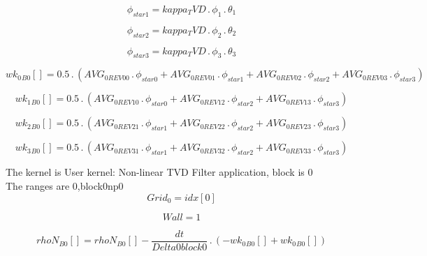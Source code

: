 \documentclass{article}
\begin{document}
\begin{dmath}\phi_{star 1} = kappa_TVD \,.\, \phi_{1} \,.\, \theta_{1}\end{dmath}

\begin{dmath}\phi_{star 2} = kappa_TVD \,.\, \phi_{2} \,.\, \theta_{2}\end{dmath}

\begin{dmath}\phi_{star 3} = kappa_TVD \,.\, \phi_{3} \,.\, \theta_{3}\end{dmath}

\begin{dmath}{wk_{0}{_{B0}}}[{}] = 0.5 \,.\, \left(AVG_{0 REV 00} \,.\, \phi_{star 0} + AVG_{0 REV 01} \,.\, \phi_{star 1} + AVG_{0 REV 02} \,.\, \phi_{star 2} + AVG_{0 REV 03} \,.\, \phi_{star 3}\right)\end{dmath}

\begin{dmath}{wk_{1}{_{B0}}}[{}] = 0.5 \,.\, \left(AVG_{0 REV 10} \,.\, \phi_{star 0} + AVG_{0 REV 12} \,.\, \phi_{star 2} + AVG_{0 REV 13} \,.\, \phi_{star 3}\right)\end{dmath}

\begin{dmath}{wk_{2}{_{B0}}}[{}] = 0.5 \,.\, \left(AVG_{0 REV 21} \,.\, \phi_{star 1} + AVG_{0 REV 22} \,.\, \phi_{star 2} + AVG_{0 REV 23} \,.\, \phi_{star 3}\right)\end{dmath}

\begin{dmath}{wk_{3}{_{B0}}}[{}] = 0.5 \,.\, \left(AVG_{0 REV 31} \,.\, \phi_{star 1} + AVG_{0 REV 32} \,.\, \phi_{star 2} + AVG_{0 REV 33} \,.\, \phi_{star 3}\right)\end{dmath}

\noindent The kernel is User kernel: Non-linear TVD Filter application, block is 0\\\noindent The ranges are 0,block0np0\\\begin{dmath}Grid_{0} = {idx}[{0}]\end{dmath}

\begin{dmath}Wall = 1\end{dmath}

\begin{dmath}{rhoN{_{B0}}}[{}] = {rhoN{_{B0}}}[{}] - \frac{dt}{Delta0block0} \,.\, \left(- {wk_{0}{_{B0}}}[{}] + {wk_{0}{_{B0}}}[{}]\right)\end{dmath}
\end{document}
